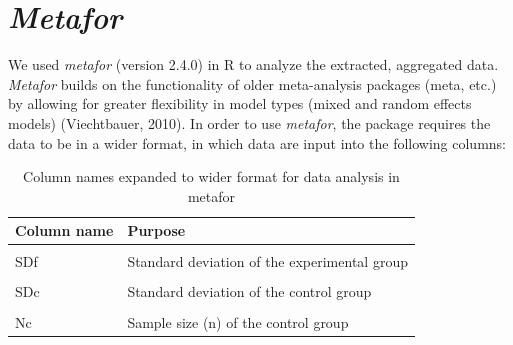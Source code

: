\documentclass[12pt,twoside]{reedthesis}
\begin{document}
\hypertarget{metafor}{%
\section{\texorpdfstring{\emph{Metafor}}{Metafor}}\label{metafor}}

We used \emph{metafor} (version 2.4.0) in R to analyze the extracted, aggregated data. \emph{Metafor} builds on the functionality of older meta-analysis packages (meta, etc.) by allowing for greater flexibility in model types (mixed and random effects models) (Viechtbauer, 2010). In order to use \emph{metafor}, the package requires the data to be in a wider format, in which data are input into the following columns:
\begin{table}[!h]

\caption{\label{tab:unnamed-chunk-10}Column names expanded to wider format for data analysis in metafor}
\centering
\begin{tabular}[t]{ll}
\toprule
\textbf{Column name} & \textbf{Purpose}\\
\midrule
\cellcolor{gray!6}{Mf} & \cellcolor{gray!6}{Mean of experimental group}\\
SDf & Standard deviation of the experimental group\\
\cellcolor{gray!6}{Mc} & \cellcolor{gray!6}{Mean of the control group}\\
SDc & Standard deviation of the control group\\
\cellcolor{gray!6}{Nf} & \cellcolor{gray!6}{Sample size (n) of the experimental group}\\
\addlinespace
Nc & Sample size (n) of the control group\\
\bottomrule
\end{tabular}
\end{table}
\linebreak
\end{document}
